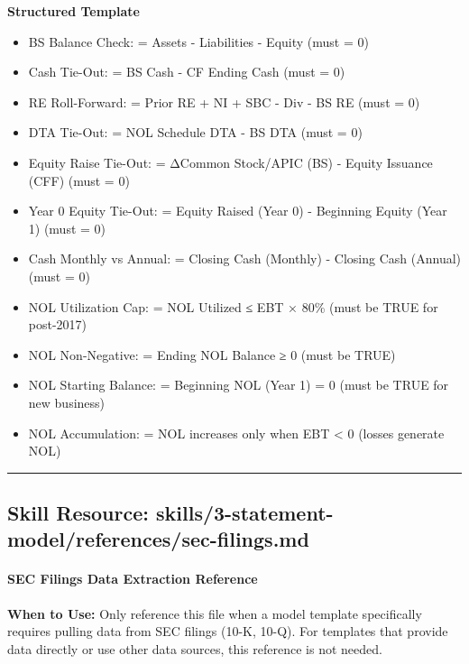 \documentclass[11pt]{article}
\begin{document}
\textbf{Structured Template}
\begin{itemize}[leftmargin=*,itemsep=2pt,topsep=2pt]
\item {} BS Balance Check: = Assets - Liabilities - Equity (must = 0)
\item {} Cash Tie-Out: = BS Cash - CF Ending Cash (must = 0)
\item {} RE Roll-Forward: = Prior RE + NI + SBC - Div - BS RE (must = 0)
\item {} DTA Tie-Out: = NOL Schedule DTA - BS DTA (must = 0)
\item {} Equity Raise Tie-Out: = ΔCommon Stock/APIC (BS) - Equity Issuance (CFF) (must = 0)
\item {} Year 0 Equity Tie-Out: = Equity Raised (Year 0) - Beginning Equity (Year 1) (must = 0)
\item {} Cash Monthly vs Annual: = Closing Cash (Monthly) - Closing Cash (Annual) (must = 0)
\item {} NOL Utilization Cap: = NOL Utilized ≤ EBT × 80\% (must be TRUE for post-2017)
\item {} NOL Non-Negative: = Ending NOL Balance ≥ 0 (must be TRUE)
\item {} NOL Starting Balance: = Beginning NOL (Year 1) = 0 (must be TRUE for new business)
\item {} NOL Accumulation: = NOL increases only when EBT < 0 (losses generate NOL)
\end{itemize}

\vspace{0.8em}\hrule\vspace{0.8em}

\subsection{Skill Resource: skills/3-statement-model/references/sec-filings.md}\label{file:skills-3-statement-model-references-sec-filings-md}

\paragraph{SEC Filings Data Extraction Reference}\mbox{}\par

\textbf{When to Use:} Only reference this file when a model template specifically requires pulling data from SEC filings (10-K, 10-Q). For templates that provide data directly or use other data sources, this reference is not needed.
\end{document}
